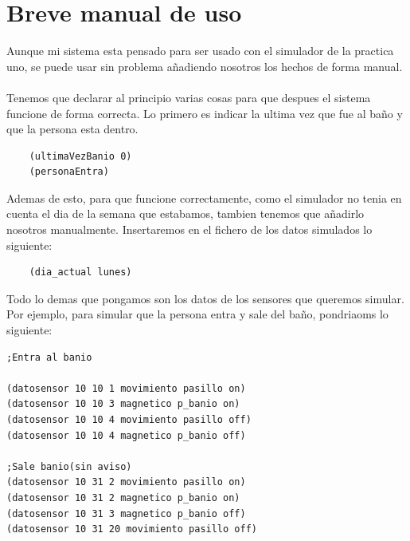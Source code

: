 \documentclass[12pt,a4paper]{article}
\begin{document}
\section{Breve manual de uso}
Aunque mi sistema esta pensado para ser usado con el simulador de la practica uno, se puede usar sin problema añadiendo nosotros los hechos de forma manual.\\\\
Tenemos que declarar al principio varias cosas para que despues el sistema funcione de forma correcta. Lo primero es indicar la ultima vez que fue al baño y que la persona esta dentro.
\begin{lstlisting}
	(ultimaVezBanio 0)
	(personaEntra)
\end{lstlisting}
Ademas de esto, para que funcione correctamente, como el simulador no tenia en cuenta el dia de la semana que estabamos, tambien tenemos que añadirlo nosotros manualmente. Insertaremos en el fichero de los datos simulados lo siguiente:
\begin{lstlisting}
	(dia_actual lunes)
\end{lstlisting}
Todo lo demas que pongamos son los datos de los sensores que queremos simular. Por ejemplo, para simular que la persona entra y sale del baño, pondriaoms lo siguiente:
\begin{lstlisting}
;Entra al banio

(datosensor 10 10 1 movimiento pasillo on)
(datosensor 10 10 3 magnetico p_banio on)
(datosensor 10 10 4 movimiento pasillo off)
(datosensor 10 10 4 magnetico p_banio off)

;Sale banio(sin aviso)
(datosensor 10 31 2 movimiento pasillo on)
(datosensor 10 31 2 magnetico p_banio on)
(datosensor 10 31 3 magnetico p_banio off)
(datosensor 10 31 20 movimiento pasillo off)
\end{lstlisting}
\end{document}
